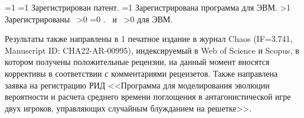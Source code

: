 {\begin{refsection}
        \ifnum \value{citeregistered}=1%
            \ifnum \value{citeauthorpatent}=1%
                Зарегистрирован  патент.
            \fi%
            \ifnum \value{citeauthorprogram}=1%
                Зарегистрирована  программа для ЭВМ.
            \fi%
        \fi%
        \ifnum \value{citeregistered}>1%
            Зарегистрированы\ %
            \ifnum \value{citeauthorpatent}>0%
            \sloppy%
            \ifnum \value{citeauthorprogram}=0 . \else \ и~\fi%
            \fi%
            \ifnum \value{citeauthorprogram}>0%
             для ЭВМ.
            \fi%
        \fi%
    \end{refsection}%
    \begin{refsection}
        \nocite{vakbib2}%
        \nocite{patbib1}%
        \nocite{progbib1}%
        \nocite{bib1}%
        \nocite{confbib1}%
    \end{refsection}%
}

Результаты также направлены в 1 печатное издание в журнал Chaos (IF=3.741, Manuscript ID: CHA22-AR-00995), индексируемый
в Web of Science и Scopus, в котором получены положительные
рецензии, на данный момент вносятся коррективы в соответствии
с комментариями рецензетов. Также направлена заявка на регистрацию РИД
<<Программа для моделирования эволюции вероятности и 
расчета среднего времени поглощения в антагонистической игре двух игроков, управляющих 
случайным блужданием на решетке>>.


